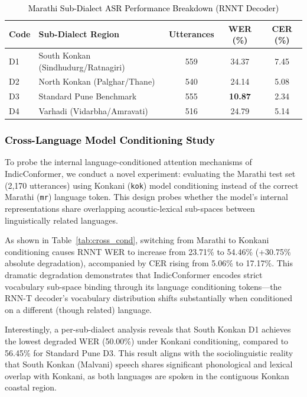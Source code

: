 \begin{table}[t]
\color{black}
\centering
\caption{\textcolor{black}{Marathi Sub-Dialect ASR Performance Breakdown (RNNT Decoder)}}
\label{tab:mr_subdialect}
\begin{tabular}{llccc}
\hline
\textbf{Code} & \textbf{Sub-Dialect Region} & \textbf{Utterances} & \textbf{WER (\%)} & \textbf{CER (\%)} \\
\hline
D1 & South Konkan (Sindhudurg/Ratnagiri) & 559 & 34.37 & 7.45 \\
D2 & North Konkan (Palghar/Thane) & 540 & 24.14 & 5.08 \\
D3 & Standard Pune Benchmark & 555 & \textbf{10.87} & 2.34 \\
D4 & Varhadi (Vidarbha/Amravati) & 516 & 24.79 & 5.14 \\
\hline
\end{tabular}
\end{table}

\subsubsection{\textcolor{black}{Cross-Language Model Conditioning Study}}

To probe the internal language-conditioned attention mechanisms of IndicConformer, we conduct a novel experiment: evaluating the Marathi test set (2,170 utterances) using Konkani (\texttt{kok}) model conditioning instead of the correct Marathi (\texttt{mr}) language token. This design probes whether the model's internal representations share overlapping acoustic-lexical sub-spaces between linguistically related languages.

As shown in Table~\ref{tab:cross_cond}, switching from Marathi to Konkani conditioning causes RNNT WER to increase from 23.71\% to 54.46\% (+30.75\% absolute degradation), accompanied by CER rising from 5.06\% to 17.17\%. This dramatic degradation demonstrates that IndicConformer encodes strict vocabulary sub-space binding through its language conditioning tokens---the RNN-T decoder's vocabulary distribution shifts substantially when conditioned on a different (though related) language.

Interestingly, a per-sub-dialect analysis reveals that South Konkan D1 achieves the lowest degraded WER (50.00\%) under Konkani conditioning, compared to 56.45\% for Standard Pune D3. This result aligns with the sociolinguistic reality that South Konkan (Malvani) speech shares significant phonological and lexical overlap with Konkani, as both languages are spoken in the contiguous Konkan coastal region.

